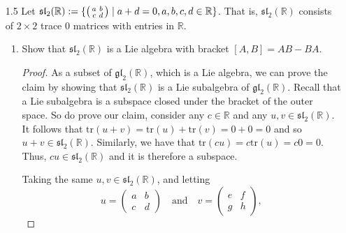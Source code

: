 \documentclass[12pt]{article}
\theoremstyle{definition}
\theoremstyle{definition}
\newenvironment{solution}
  {\renewcommand\qedsymbol{$\blacksquare$}\begin{proof}[Solution]}
  {\end{proof}}
\newenvironment{psmall}
  {\left(\begin{smallmatrix}}
  {\end{smallmatrix}\right)}
\begin{document}
\begin{enumerate}
\begin{solution}
\begin{equation*}
                \end{equation*}
            \end{solution}
        \item[1.5] Let
            $\mathfrak{sl}_2(\mathbb{R}):=\{\begin{psmall}a&b\\c&d\end{psmall}\mid
            a+d=0, a, b, c, d\in\mathbb{R}\}$. That is,
            $\mathfrak{sl}_2(\mathbb{R})$ consists
            of $2\times 2$ trace 0 matrices with entries in $\mathbb{R}$.
            \begin{enumerate}[label=(\alph*)]
                \item Show that $\mathfrak{sl}_2(\mathbb{R})$ is a Lie algebra with
                    bracket $[A, B]=AB-BA$.
                    \begin{proof}
                        As a subset of $\mathfrak{gl}_{2}(\mathbb{R})$, which
                        is a Lie algebra, we can prove the claim by
                        showing that $\mathfrak{sl}_{2}(\mathbb{R})$
                        is a Lie subalgebra of $\mathfrak{gl}_{2}(\mathbb{R})$.
                        Recall that a Lie subalgebra is a subspace
                        closed under the bracket of the outer space. So
                        do prove our claim,
                        consider any $c\in\mathbb{R}$ and any $u,
                        v\in\mathfrak{sl}_{2}(\mathbb{R})$. It follows that
                        $\text{tr}(u+v)=\text{tr}(u)+\text{tr}(v)=0+0=0$
                        and so $u+v\in\mathfrak{sl}_{2}(\mathbb{R})$.
                        Similarly, we have that
                        $\text{tr}(cu)=c\text{tr}(u)=c0=0$. Thus,
                        $cu\in\mathfrak{sl}_{2}(\mathbb{R})$ and it is
                        therefore a subspace.\par\hspace{4mm} Taking
                        the same $u,
                        v\in\mathfrak{sl}_{2}(\mathbb{R})$, and letting 
                        \begin{equation*}
                            u=\begin{pmatrix} a&b\\c&d
                            \end{pmatrix}\quad\text{and}\quad
                            v=\begin{pmatrix}e&f\\g&h
                            \end{pmatrix},  

\end{equation*}
\end{proof}
\end{enumerate}
\end{enumerate}
\end{document}
